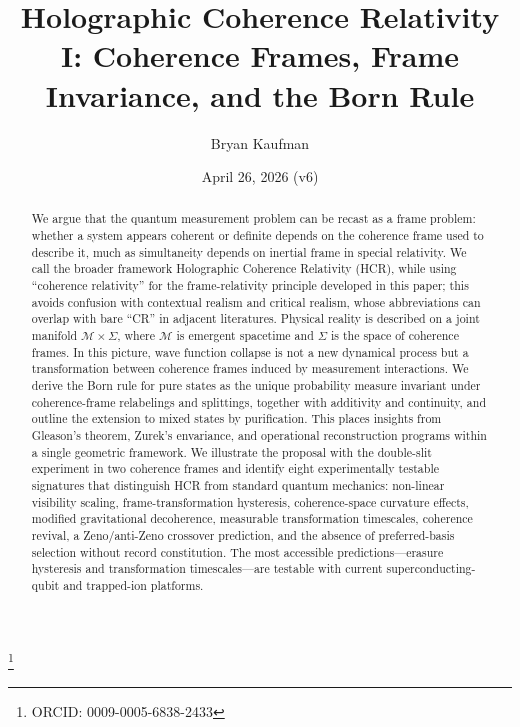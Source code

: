 \documentclass[aps,prd,twocolumn,superscriptaddress,nofootinbib,floatfix]{revtex4-2}
\newcommand{\Sig}{\Sigma}
\newcommand{\HCRname}{Holographic Coherence Relativity}
\newcommand{\HCR}{HCR}
\begin{document}
\title{\HCRname{} I: Coherence Frames, Frame Invariance, and the Born Rule}

\author{Bryan Kaufman}
\thanks{ORCID: 0009-0005-6838-2433}

\date{April 26, 2026 (v6)}



\begin{abstract}
We argue that the quantum measurement problem can be recast as a frame problem: whether a system appears coherent or definite depends on the coherence frame used to describe it, much as simultaneity depends on inertial frame in special relativity. We call the broader framework \HCRname{} (\HCR), while using ``coherence relativity'' for the frame-relativity principle developed in this paper; this avoids confusion with contextual realism and critical realism, whose abbreviations can overlap with bare ``CR'' in adjacent literatures. Physical reality is described on a joint manifold $\mathcal{M} \times \Sig$, where $\mathcal{M}$ is emergent spacetime and $\Sig$ is the space of coherence frames. In this picture, wave function collapse is not a new dynamical process but a transformation between coherence frames induced by measurement interactions. We derive the Born rule for pure states as the unique probability measure invariant under coherence-frame relabelings and splittings, together with additivity and continuity, and outline the extension to mixed states by purification. This places insights from Gleason's theorem, Zurek's envariance, and operational reconstruction programs within a single geometric framework. We illustrate the proposal with the double-slit experiment in two coherence frames and identify eight experimentally testable signatures that distinguish \HCR{} from standard quantum mechanics: non-linear visibility scaling, frame-transformation hysteresis, coherence-space curvature effects, modified gravitational decoherence, measurable transformation timescales, coherence revival, a Zeno/anti-Zeno crossover prediction, and the absence of preferred-basis selection without record constitution. The most accessible predictions---erasure hysteresis and transformation timescales---are testable with current superconducting-qubit and trapped-ion platforms.
\end{abstract}
\end{document}

